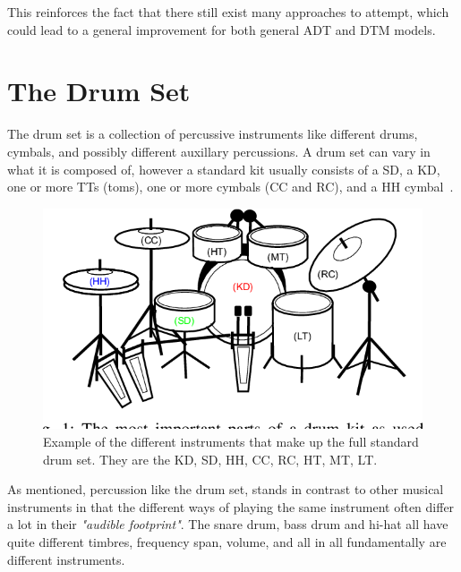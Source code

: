 This reinforces the fact that there still exist many approaches to attempt, which could lead to a general improvement for both general \gls{ADT} and \gls{DTM} models.

\section{The Drum Set}

The drum set is a collection of percussive instruments like different drums, cymbals, and possibly different auxillary percussions. A drum set can vary in what it is composed of, however a standard kit usually consists of a \gls{SD}, a \gls{KD}, one or more \glspl{TT} (toms), one or more cymbals (\gls{CC} and \gls{RC}), and a \gls{HH} cymbal~\cite{TheDrumHandbook2003}.

\begin{figure}[H]
    \centering
    \includegraphics[scale=0.7, trim={0 1cm 0 0},clip]{figures/drumset}
    \caption{Example of the different instruments that make up the full standard drum set. They are the \acrfull{KD}, \acrfull{SD}, \acrfull{HH}, \acrfull{CC}, \acrfull{RC}, \acrfull{HT}, \acrfull{MT}, \acrfull{LT}.}
    \label{DrumsetFigure}
\end{figure}

As mentioned, percussion like the drum set, stands in contrast to other musical instruments in that the different ways of playing the same instrument often differ a lot in their \textit{"audible footprint"}. The snare drum, bass drum and hi-hat all have quite different timbres, frequency span, volume, and all in all fundamentally are different instruments.

